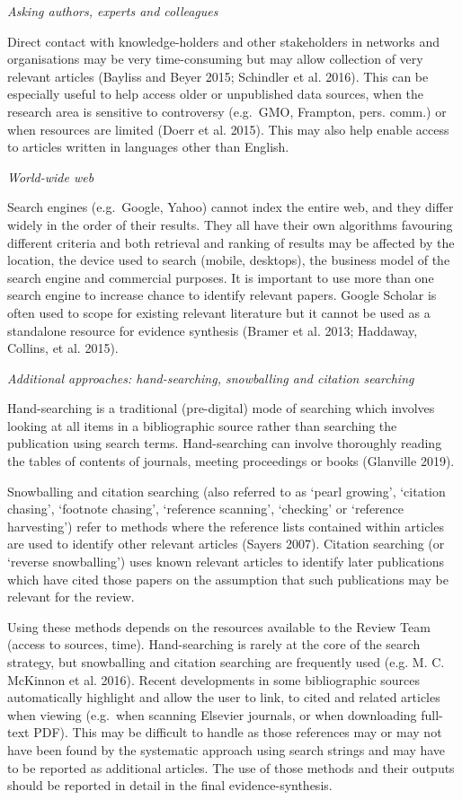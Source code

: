 \documentclass[
  letterpaper,
  DIV=11,
  numbers=noendperiod]{scrreprt}
\begin{document}
\emph{Asking authors, experts and colleagues}

Direct contact with knowledge-holders and other stakeholders in networks
and organisations may be very time-consuming but may allow collection of
very relevant articles (Bayliss and Beyer 2015; Schindler et al. 2016).
This can be especially useful to help access older or unpublished data
sources, when the research area is sensitive to controversy (e.g.~GMO,
Frampton, pers. comm.) or when resources are limited (Doerr et al.
2015). This may also help enable access to articles written in languages
other than English.

\emph{World-wide web}

Search engines (e.g.~Google, Yahoo) cannot index the entire web, and
they differ widely in the order of their results. They all have their
own algorithms favouring different criteria and both retrieval and
ranking of results may be affected by the location, the device used to
search (mobile, desktops), the business model of the search engine and
commercial purposes. It is important to use more than one search engine
to increase chance to identify relevant papers. Google Scholar is often
used to scope for existing relevant literature but it cannot be used as
a standalone resource for evidence synthesis (Bramer et al. 2013;
Haddaway, Collins, et al. 2015).

\emph{Additional approaches: hand-searching, snowballing and citation
searching}

Hand-searching is a traditional (pre-digital) mode of searching which
involves looking at all items in a bibliographic source rather than
searching the publication using search terms. Hand-searching can involve
thoroughly reading the tables of contents of journals, meeting
proceedings or books (Glanville 2019).

Snowballing and citation searching (also referred to as `pearl growing',
`citation chasing', `footnote chasing', `reference scanning', `checking'
or `reference harvesting') refer to methods where the reference lists
contained within articles are used to identify other relevant articles
(Sayers 2007). Citation searching (or `reverse snowballing') uses known
relevant articles to identify later publications which have cited those
papers on the assumption that such publications may be relevant for the
review.

Using these methods depends on the resources available to the Review
Team (access to sources, time). Hand-searching is rarely at the core of
the search strategy, but snowballing and citation searching are
frequently used (e.g. M. C. McKinnon et al. 2016). Recent developments
in some bibliographic sources automatically highlight and allow the user
to link, to cited and related articles when viewing (e.g.~when scanning
Elsevier journals, or when downloading full-text PDF). This may be
difficult to handle as those references may or may not have been found
by the systematic approach using search strings and may have to be
reported as additional articles. The use of those methods and their
outputs should be reported in detail in the final evidence-synthesis.
\end{document}
